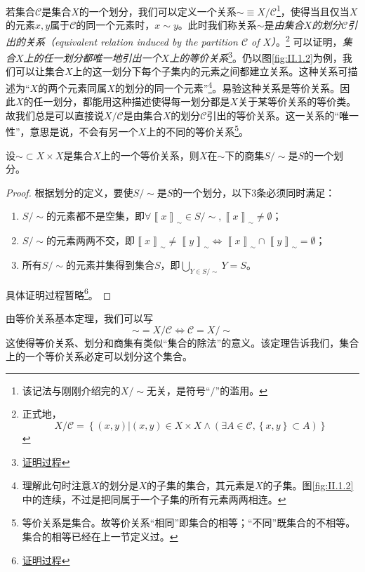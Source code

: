 \documentclass[../main.tex]{subfiles}
\begin{document}
若集合$\mathcal{C}$是集合$X$的一个划分，我们可以定义一个关系$\sim\equiv X/\mathcal{C}$\footnote{该记法与刚刚介绍完的$X/\sim$无关，是符号“$/$”的滥用。}，使得当且仅当$X$的元素$x,y$属于$\mathcal{C}$的同一个元素时，$x\sim y$。此时我们称关系$\sim$是\emph{由集合$X$的划分$\mathcal{C}$引出的关系（equivalent relation induced by the partition $\mathcal{C}$ of $X$）}。\footnote{正式地，
    \[
        X/\mathcal{C}=\left\{\left(x,y\right)|\left(x,y\right)\in X\times X\wedge\left(\exists A\in \mathcal{C},\left\{x,y\right\}\subset A\right)\right\}
    \]
}
可以证明，\emph{集合$X$上的任一划分都唯一地引出一个$X$上的等价关系}\footnote{\href{https://proofwiki.org/wiki/Relation_Induced_by_Partition_is_Equivalence}{证明过程}}。仍以图\ref{fig:II.1.2}为例，我们可以让集合$X$上的这一划分下每个子集内的元素之间都建立关系。这种关系可描述为“$X$的两个元素同属$X$的划分的同一个元素”\footnote{理解此句时注意$X$的划分是$X$的子集的集合，其元素是$X$的子集。图\ref{fig:II.1.2}中的连续，不过是把同属于一个子集的所有元素两两相连。}。易验这种关系是等价关系。因此$X$的任一划分，都能用这种描述使得每一划分都是$X$关于某等价关系的等价类。故我们总是可以直接说$X/\mathcal{C}$是由集合$X$的划分$\mathcal{C}$引出的等价关系。这一关系的“唯一性”，意思是说，不会有另一个$X$上的不同的等价关系\footnote{等价关系是集合。故等价关系“相同”即集合的相等；“不同”既集合的不相等。集合的相等已经在上一节定义过。}。

\begin{theorem}[等价关系基本定理]
    设$\sim\subset X\times X$是集合$X$上的一个等价关系，则$X$在$\sim$下的商集$S/\sim$是$S$的一个划分。
\end{theorem}
\begin{proof}
    根据划分的定义，要使$S/\sim$是$S$的一个划分，以下3条必须同时满足：
    \begin{enumerate}
        \item $S/\sim$的元素都不是空集，即$\forall\left\llbracket x\right\rrbracket_\sim\in S/\sim,\left\llbracket x\right\rrbracket_\sim\neq\emptyset$；
        \item $S/\sim$的元素两两不交，即$\left\llbracket x\right\rrbracket_\sim\neq\left\llbracket y\right\rrbracket_\sim\Leftrightarrow\left\llbracket x\right\rrbracket_\sim\cap\left\llbracket y\right\rrbracket_\sim=\emptyset$；
        \item 所有$S/\sim$的元素并集得到集合$S$，即$\bigcup_{Y\in S/\sim}Y=S$。
    \end{enumerate}
    具体证明过程暂略\footnote{\href{https://proofwiki.org/wiki/Fundamental_Theorem_on_Equivalence_Relations}{证明过程}}。
\end{proof}

由等价关系基本定理，我们可以写
\[
    \sim=X/\mathcal{C}\Leftrightarrow \mathcal{C}=X/\sim
\]
这使得等价关系、划分和商集有类似“集合的除法”的意义。该定理告诉我们，集合上的一个等价关系必定可以划分这个集合。
\end{document}
